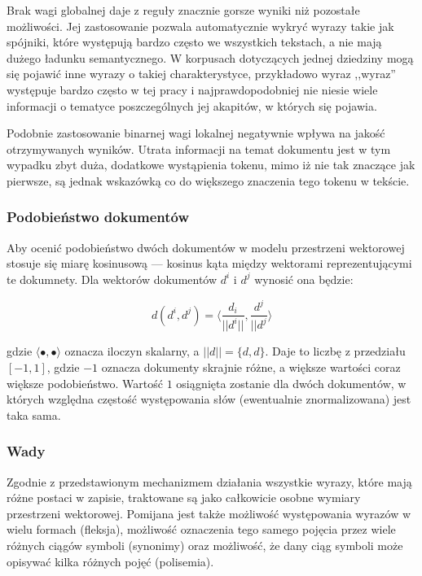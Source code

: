 \documentclass[11pt,a4paper]{article}
\begin{document}
Brak wagi globalnej daje z reguły znacznie gorsze wyniki niż pozostałe
możliwości. Jej zastosowanie pozwala automatycznie wykryć wyrazy takie jak
spójniki, które występują bardzo często we wszystkich tekstach, a nie mają
dużego ładunku semantycznego. W korpusach dotyczących jednej dziedziny mogą się
pojawić inne wyrazy o takiej charakterystyce, przykładowo wyraz ,,wyraz''
występuje bardzo często w tej pracy i najprawdopodobniej nie niesie wiele
informacji o tematyce poszczególnych jej akapitów, w których się pojawia.

Podobnie zastosowanie binarnej wagi lokalnej negatywnie wpływa na jakość
otrzymywanych wyników. Utrata informacji na temat dokumentu jest w tym wypadku
zbyt duża, dodatkowe wystąpienia tokenu, mimo iż nie tak znaczące jak pierwsze,
są jednak wskazówką co do większego znaczenia tego tokenu w tekście.

\subsubsection{Podobieństwo dokumentów}

Aby ocenić podobieństwo dwóch dokumentów w modelu przestrzeni wektorowej
stosuje się miarę kosinusową --- kosinus kąta między wektorami reprezentującymi
te dokumnety. Dla wektorów dokumentów $d^i$ i $d^j$ wynosić ona będzie:

\begin{equation}
  d(d^i, d^j) = \langle \frac{d_i}{||d^i||}, \frac{d^j}{||d^j} \rangle
\end{equation}

\noindent
gdzie $\langle \bullet, \bullet \rangle$ oznacza iloczyn skalarny, a $||d|| =
\lbrace d, d \rbrace$. Daje to liczbę z przedziału $[-1,1]$, gdzie $-1$ oznacza
dokumenty skrajnie różne, a większe wartości coraz większe podobieństwo.
Wartość $1$ osiągnięta zostanie dla dwóch dokumentów, w których względna
częstość występowania słów (ewentualnie znormalizowana) jest taka sama.

\subsubsection{Wady}

Zgodnie z przedstawionym mechanizmem działania wszystkie wyrazy, które mają
różne postaci w zapisie, traktowane są jako całkowicie osobne wymiary
przestrzeni wektorowej. Pomijana jest także możliwość występowania wyrazów w
wielu formach (fleksja), możliwość oznaczenia tego samego pojęcia przez wiele
różnych ciągów symboli (synonimy) oraz możliwość, że dany ciąg symboli może
opisywać kilka różnych pojęć (polisemia).
\end{document}
